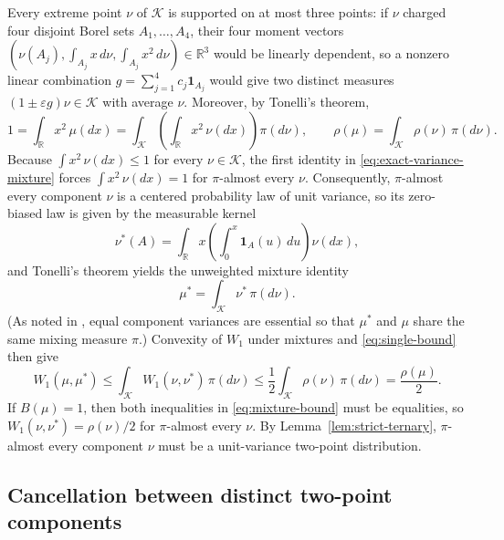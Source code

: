 \documentclass[11pt]{article}
\numberwithin{equation}{section}
\theoremstyle{remark}
\newcommand{\R}{\mathbb R}
\begin{document}
Every extreme point $\nu$ of $\mathcal K$ is supported on at most three
points: if $\nu$ charged four disjoint Borel sets $A_1,\ldots,A_4$, their
four moment vectors $(\nu(A_j),\int_{A_j}x\,d\nu,\int_{A_j}x^2\,d\nu)\in\R^3$
would be linearly dependent, so a nonzero linear combination
$g=\sum_{j=1}^4c_j\mathbf1_{A_j}$ would give two distinct measures
$(1\pm\varepsilon g)\nu\in\mathcal K$ with average $\nu$. Moreover, by
Tonelli's theorem,
\begin{equation}\label{eq:exact-variance-mixture}
 1=\int_\R x^2\,\mu(dx)=\int_{\mathcal K}\left(\int_\R x^2\,\nu(dx)\right)\pi(d\nu),\qquad
 \rho(\mu)=\int_{\mathcal K}\rho(\nu)\,\pi(d\nu).
\end{equation}
Because $\int x^2\,\nu(dx)\le1$ for every $\nu\in\mathcal K$, the first
identity in \eqref{eq:exact-variance-mixture} forces $\int x^2\,\nu(dx)=1$
for $\pi$-almost every $\nu$. Consequently, $\pi$-almost every component $\nu$
is a centered probability law of unit variance, so its zero-biased law is
given by the measurable kernel
\begin{equation}\label{eq:bias-kernel}
             \nu^*(A)=\int_\R x\left(\int_0^x\mathbf1_A(u)\,du\right)\nu(dx),
\end{equation}
and Tonelli's theorem yields the unweighted mixture identity
\begin{equation}\label{eq:same-weight}
                        \mu^*=\int_{\mathcal K}\nu^*\,\pi(d\nu).
\end{equation}
(As noted in \citet[Theorem~2.2 and Remark~2.2]{Goldstein2010}, equal component
variances are essential so that $\mu^*$ and $\mu$ share the same mixing
measure $\pi$.) Convexity of $W_1$ under mixtures and \eqref{eq:single-bound}
then give
\begin{equation}\label{eq:mixture-bound}
 W_1(\mu,\mu^*)
 \le\int_{\mathcal K} W_1(\nu,\nu^*)\,\pi(d\nu)
 \le\frac12\int_{\mathcal K}\rho(\nu)\,\pi(d\nu)=\frac{\rho(\mu)}2.
\end{equation}
If $B(\mu)=1$, then both inequalities in \eqref{eq:mixture-bound} must be
equalities, so $W_1(\nu,\nu^*)=\rho(\nu)/2$ for $\pi$-almost every $\nu$. By
Lemma~\ref{lem:strict-ternary}, $\pi$-almost every component $\nu$ must be a
unit-variance two-point distribution.

\subsection{Cancellation between distinct two-point components}
\end{document}

